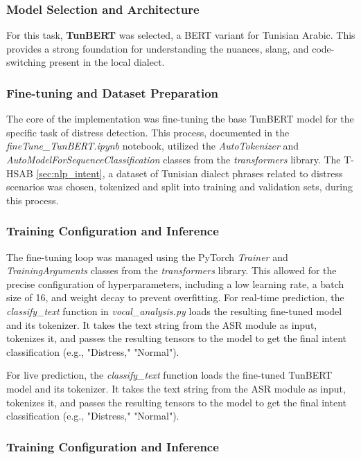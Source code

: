 \documentclass[12pt,a4paper,oneside,english]{book}
\begin{document}
{\subsubsection{Model Selection and Architecture}
\label{sec:tunbert selection}
For this task, \textbf{TunBERT} was selected, a BERT variant for Tunisian Arabic. This provides a strong foundation for understanding the nuances, slang, and code-switching present in the local dialect.

\subsubsection{Fine-tuning and Dataset Preparation}
\label{sec:finetuning tunbert}
The core of the implementation was fine-tuning the base TunBERT model for the specific task of distress detection. This process, documented in the \textit{fineTune\_TunBERT.ipynb} notebook, 
utilized the \textit{AutoTokenizer} and \textit{AutoModelForSequenceClassification} classes from the \textit{transformers} library. 
The T- HSAB \ref{sec:nlp_intent}, a dataset of Tunisian dialect phrases related to distress scenarios was chosen, tokenized and split into training and validation sets, during this process. 
\subsubsection{Training Configuration and Inference}
\label{sec:training tunbert}
The fine-tuning loop was managed using the PyTorch \textit{Trainer} and \textit{TrainingArguments} classes from the \textit{transformers} library. This allowed for the precise configuration of 
hyperparameters, including a low learning rate, a batch size of 16, and weight decay to prevent overfitting. For real-time prediction, the \textit{classify\_text} function in \textit{vocal\_analysis.py} 
loads the resulting fine-tuned model and its tokenizer. It takes the text string from the ASR module as input, tokenizes it, and passes the resulting tensors to the model to get the final intent 
classification (e.g., "Distress," "Normal").

For live prediction, the \textit{classify\_text} function loads the fine-tuned TunBERT model and its tokenizer. It takes the text string from the ASR module as input, tokenizes it, and passes the 
resulting tensors to the model to get the final intent classification (e.g., "Distress," "Normal").

\subsubsection{Training Configuration and Inference}
\label{sec:training_tunbert}

}
\end{document}
